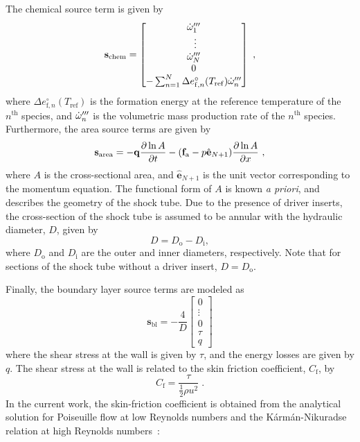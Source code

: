 The chemical source term is given by
\begin{equation}
	\mathbf{s}_\mathrm{chem} = \begin{bmatrix}
	\dot{\omega}^{\prime\prime\prime}_1 \\\
	\vdots\\
	\dot{\omega}^{\prime\prime\prime}_N\\
	0\\
	-\sum_{n=1}^N\Delta e_{\mathrm{f},n}^\circ(T_\mathrm{ref})\dot{\omega}^{\prime\prime\prime}_n
	\end{bmatrix}\ ,
\end{equation}
where $\Delta e_{\mathrm{f},n}^\circ(T_\mathrm{ref})$ is the formation energy at the reference temperature  of the $n^\mathrm{th}$ species, and $\dot{\omega}^{\prime\prime\prime}_n$ is the volumetric mass production rate of the $n^\mathrm{th}$ species. Furthermore, the area source terms are given by 
\begin{equation}
\mathbf{s}_\mathrm{area}=
-\mathbf{q}\frac{\p\ln A}{\p t} -(\mathbf{f}_\mathrm{a}-p\hat{\mathbf{e}}_{N+1})\frac{\p\ln A}{\p x}\ ,
\end{equation}
where $A$ is the cross-sectional area, and $\hat{\mathbf{e}}_{N+1}$ is the unit vector corresponding to the momentum equation. The functional form of $A$ is known \emph{a priori}, and describes the geometry of the shock tube. Due to the presence of driver inserts, the cross-section of the shock tube is assumed to be annular with the hydraulic diameter, $D$, given by
\begin{equation}
D=D_\mathrm{o}-D_\mathrm{i} ,
\end{equation}
where $D_\mathrm{o}$ and $D_\mathrm{i}$ are the outer and inner diameters, respectively. Note that for sections of the shock tube without a driver insert, $D=D_\mathrm{o}$.

Finally, the boundary layer source terms are modeled as 
\begin{equation}\label{EQ_BLSRC}
	\mathbf{s}_\mathrm{bl}=-\frac{4}{D}\begin{bmatrix}
		0\\
		\vdots\\
		0\\
		\tau\\
		q
	\end{bmatrix}
\end{equation}
where the shear stress at the wall is given by $\tau$, and the energy losses are given by $q$. The shear stress at the wall is related to the skin friction coefficient, $C_\mathrm{f}$, by
\begin{equation}
\label{EQ_TAU}
C_{\mathrm{f}}=\frac{\tau}{\frac{1}{2}\rho u^{2}}\; .
\end{equation}
In the current work, the skin-friction coefficient is obtained from the analytical solution for Poiseuille flow at low Reynolds numbers and the K\'arm\'an-Nikuradse relation at high Reynolds numbers~\cite{KAYS_BOOK2005}:

